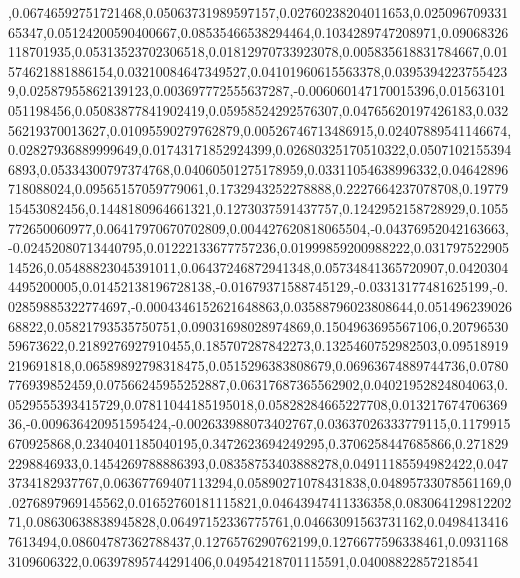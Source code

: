 ,0.06746592751721468,0.05063731989597157,0.02760238204011653,0.02509670933165347,0.05124200590400667,0.08535466538294464,0.1034289747208971,0.09068326118701935,0.05313523702306518,0.01812970733923078,0.005835618831784667,0.01574621881886154,0.03210084647349527,0.04101960615563378,0.03953942237554239,0.02587955862139123,0.003697772555637287,-0.006060147170015396,0.01563101051198456,0.05083877841902419,0.05958524292576307,0.04765620197426183,0.03256219370013627,0.01095590279762879,0.00526746713486915,0.02407889541146674,0.02827936889999649,0.01743171852924399,0.02680325170510322,0.05071021553946893,0.05334300797374768,0.04060501275178959,0.03311054638996332,0.04642896718088024,0.09565157059779061,0.1732943252278888,0.2227664237078708,0.1977915453082456,0.1448180964661321,0.1273037591437757,0.1242952158728929,0.1055772650060977,0.06417970670702809,0.004427620818065504,-0.04376952042163663,-0.02452080713440795,0.01222133677757236,0.01999859200988222,0.03179752290514526,0.05488823045391011,0.06437246872941348,0.05734841365720907,0.04203044495200005,0.01452138196728138,-0.01679371588745129,-0.03313177481625199,-0.02859885322774697,-0.0004346152621648863,0.03588796023808644,0.05149623902668822,0.05821793535750751,0.09031698028974869,0.1504963695567106,0.2079653059673622,0.2189276927910455,0.185707287842273,0.1325460752982503,0.09518919219691818,0.06589892798318475,0.0515296383808679,0.06963674889744736,0.0780776939852459,0.07566245955252887,0.06317687365562902,0.04021952824804063,0.0529555393415729,0.07811044185195018,0.05828284665227708,0.01321767470636936,-0.009636420951595424,-0.002633988073402767,0.03637026333779115,0.1179915670925868,0.2340401185040195,0.3472623694249295,0.3706258447685866,0.2718292298846933,0.1454269788886393,0.08358753403888278,0.04911185594982422,0.0473734182937767,0.06367769407113294,0.05890271078431838,0.04895733078561169,0.0276897969145562,0.01652760181115821,0.04643947411336358,0.08306412981220271,0.08630638838945828,0.06497152336775761,0.04663091563731162,0.04984134167613494,0.08604787362788437,0.1276576290762199,0.1276677596338461,0.09311683109606322,0.06397895744291406,0.04954218701115591,0.04008822857218541
